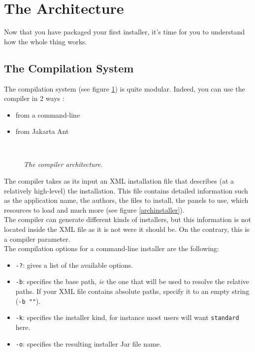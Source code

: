\section{The \IzPack Architecture}

Now that you have packaged your first installer, it's time for you to understand
how the whole thing works.\\

\subsection{The Compilation System}

The compilation system (see figure \ref{comparch}) is quite modular. 
Indeed, you can use the compiler in 2 ways :
\begin{itemize}
  \item from a command-line
  \item from Jakarta Ant
\end{itemize}\

\begin{figure}[h]
\caption{\label{comparch}
         \textit{The compiler architecture.}}
\begin{center}
\end{center}
\end{figure}

The compiler takes as its input an XML installation file that describes
(at a relatively high-level) the installation. This file contains
detailed information such as the application name, the authors, the
files to install, the panels to use, which resources to load and much
more (see figure \ref{archinstaller}).\\

The compiler can generate different kinds of installers, but this information is
not located inside the XML file as it is not were it should be. On the contrary,
this is a compiler parameter.\\

The compilation options for a command-line installer are the following:
\begin{itemize}
\item \texttt{-?}: gives a list of the available options.
\item \texttt{-b}: specifies the base path, \textsl{ie} the one that will be
used to resolve the relative paths. If your XML file contains absolute paths,
specify it to an empty string (\texttt{-b ""}).
\item \texttt{-k}: specifies the installer kind, for instance most users will
want \texttt{standard} here.
\item \texttt{-o}: specifies the resulting installer Jar file name.
\end{itemize}\

